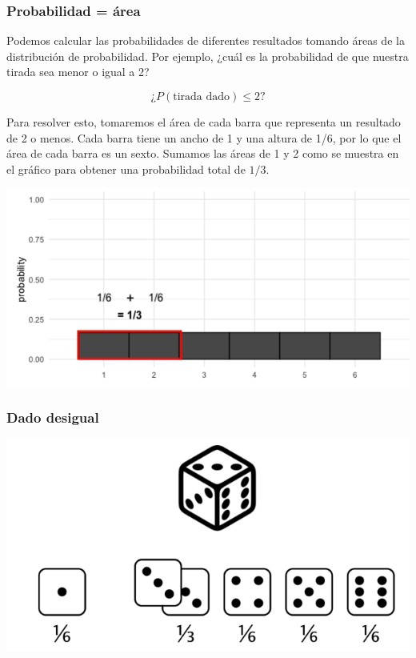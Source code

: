 \documentclass[
  letterpaper,
  DIV=11,
  numbers=noendperiod]{scrreprt}
\begin{document}
\hypertarget{probabilidad-uxe1rea}{%
\subsubsection{Probabilidad = área}\label{probabilidad-uxe1rea}}

Podemos calcular las probabilidades de diferentes resultados tomando
áreas de la distribución de probabilidad. Por ejemplo, ¿cuál es la
probabilidad de que nuestra tirada sea menor o igual a 2?

\[
¿P(\mbox{tirada dado}) \leq 2?
\]

Para resolver esto, tomaremos el área de cada barra que representa un
resultado de 2 o menos. Cada barra tiene un ancho de 1 y una altura de
1/6, por lo que el área de cada barra es un sexto. Sumamos las áreas de
1 y 2 como se muestra en el gráfico para obtener una probabilidad total
de \(1/3\).

\includegraphics{fig22.png}

\hypertarget{dado-desigual}{%
\subsubsection{Dado desigual}\label{dado-desigual}}

\includegraphics{fig23.png}
\end{document}
